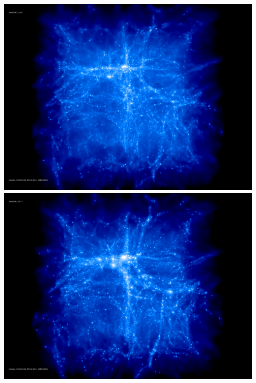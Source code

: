 \includegraphics[scale=0.1]{r256/stages_18/50.jpg} 
\includegraphics[scale=0.1]{r256/stages_18/100.jpg}  \\

